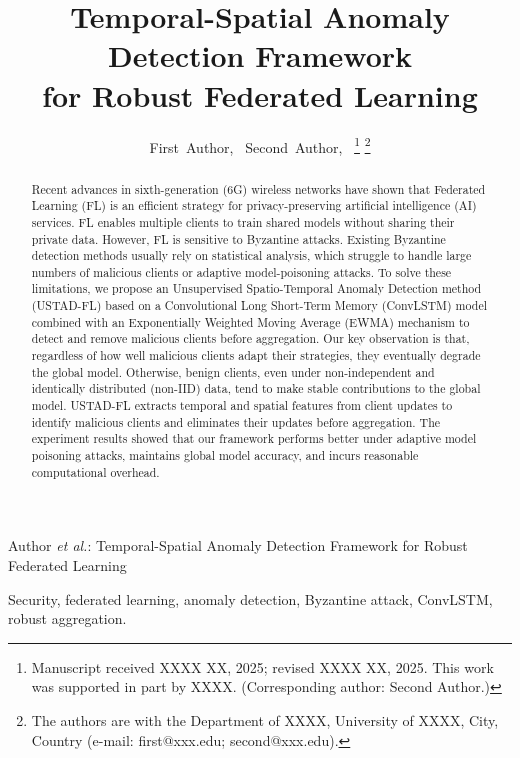 \documentclass[journal]{IEEEtran}
\begin{document}
\title{Temporal-Spatial Anomaly Detection Framework\\for Robust Federated Learning}

\author{First~Author,~
Second~Author,~
\thanks{Manuscript received XXXX XX, 2025; revised XXXX XX, 2025. This work was supported in part by XXXX. (Corresponding author: Second Author.)}
\thanks{The authors are with the Department of XXXX, University of XXXX, City, Country (e-mail: first@xxx.edu; second@xxx.edu).}}

{Author \MakeLowercase{\textit{et al.}}: Temporal-Spatial Anomaly Detection Framework for Robust Federated Learning}

\maketitle

\begin{abstract}
Recent advances in sixth-generation (6G) wireless networks have shown that Federated Learning (FL) is an efficient strategy for privacy-preserving artificial intelligence (AI) services. FL enables multiple clients to train shared models without sharing their private data. However, FL is sensitive to Byzantine attacks. Existing Byzantine detection methods usually rely on statistical analysis, which struggle to handle large numbers of malicious clients or adaptive model-poisoning attacks. To solve these limitations, we propose an Unsupervised Spatio-Temporal Anomaly Detection method (USTAD-FL) based on a Convolutional Long Short-Term Memory (ConvLSTM) model combined with an Exponentially Weighted Moving Average (EWMA) mechanism to detect and remove malicious clients before aggregation. Our key observation is that, regardless of how well malicious clients adapt their strategies, they eventually degrade the global model. Otherwise, benign clients, even under non-independent and identically distributed (non-IID) data, tend to make stable contributions to the global model. USTAD-FL extracts temporal and spatial features from client updates to identify malicious clients and eliminates their updates before aggregation. The experiment results showed that our framework performs better under adaptive model poisoning attacks, maintains global model accuracy, and incurs reasonable computational overhead.
\end{abstract}

\begin{IEEEkeywords}
Security, federated learning, anomaly detection, Byzantine attack, ConvLSTM, robust aggregation.
\end{IEEEkeywords}
\end{document}
